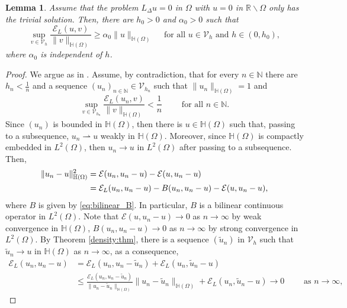 \documentclass[10 pt]{article}
\newtheorem{lemma}[theorem]{Lemma}
\numberwithin{equation}{section}
\def\N{\mathbb{N}}
\def\R{\mathbb{R}}
\def\cE{\mathcal{E}}
\begin{document}
\begin{lemma}
Assume that the problem $L_\Delta u=0$ in $\Omega$ with $u=0$ in $\R\backslash  \Omega$ only has the trivial solution.  Then, there are $h_0>0$ and $\alpha_0>0$ such that
\begin{equation*}
    \sup_{v\in \mathcal V_h}\frac{\cE_{L}(u,v)}{\|v\|_{\mathbb H(\Omega)}}\geq \alpha_0\|u\|_{\mathbb H(\Omega)} \quad\text{ for all } u\in\mathcal V_h \text{ and }h\in(0,h_0),
\end{equation*}
where $\alpha_0$ is independent of $h$.
\end{lemma}
\begin{proof}
We argue as in \cite[Theorem 4.2.1]{dem20}. Assume, by contradiction, that for every $n\in\N$ there are $h_n<\frac{1}{n}$ and a sequence $(u_n)_{n\in\N}\in \mathcal V_{h_n}$ such that $\|u_n\|_{\mathbb H(\Omega)}=1$ and
\begin{equation}\label{ccea}
    \sup_{v\in \mathcal V_{h_n}}\frac{\cE_{L}(u_n,v)}{\|v\|_{\mathbb H(\Omega)}}<\frac{1}{n}\qquad \text{ for all }n\in\N.
\end{equation}
Since $(u_n)$ is bounded in $\mathbb H(\Omega)$, then there is $u\in \mathbb H(\Omega)$ such that, passing to a subsequence, $u_n \rightharpoonup u$ weakly in $\mathbb H(\Omega)$. Moreover, since $\mathbb H(\Omega)$ is compactly embedded in $L^2(\Omega)$, then $u_n\to u$ in $L^2(\Omega)$ after passing to a subsequence.  Then,
\begin{align}
    \|u_n-u\|^2_{\mathbb H(\Omega)}
    &=\cE(u_n,u_n-u)-\cE(u,u_n-u)\notag\\
    &=\cE_L(u_n,u_n-u)-B(u_n,u_n-u)-\cE(u,u_n-u),\label{007}
\end{align}
where $B$ is given by \eqref{eq:bilinear_B}.  In particular, $B$ is a bilinear continuous operator in $L^2(\Omega)$.  Note that $\cE(u,u_n-u)\to 0$ as $n\to \infty$ by weak convergence in $\mathbb H(\Omega)$, $B(u_n,u_n-u)\to 0$ as $n\to \infty$ by strong convergence in $L^2(\Omega)$. By Theorem \ref{density:thm}, there is a sequence $(\widetilde u_n)$ in $\mathcal V_h$ such that $\widetilde u_n\to u$ in $\mathbb H(\Omega)$ as $n\to \infty$, as a consequence,
\begin{align*}
    \cE_L(u_n,u_n-u)
    &=\cE_L(u_n,u_n-\widetilde u_n)+\cE_L(u_n,\widetilde u_n-u)\\
    &\leq \frac{\cE_L(u_n,u_n-\widetilde u_n)}{\|u_n-\widetilde u_n\|_{\mathbb H(\Omega)}}\|u_n-\widetilde u_n\|_{\mathbb H(\Omega)}+\cE_L(u_n,\widetilde u_n-u) \to 0\qquad \text{ as }n\to \infty,
\end{align*}

\end{proof}
\end{document}
